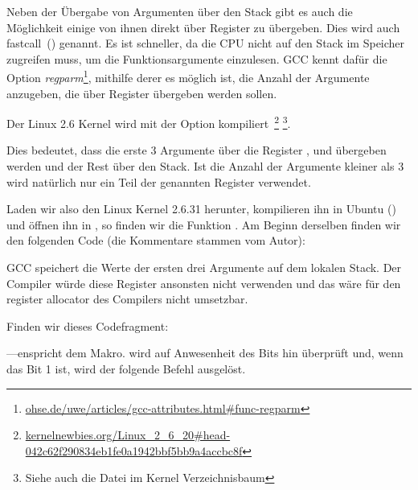 \newcommand{\URLREGPARM}{\href{http://go.yurichev.com/17040}{ohse.de/uwe/articles/gcc-attributes.html\#func-regparm}}

\label{regparm}
Neben der Übergabe von Argumenten über den Stack gibt es auch die Möglichkeit
einige von ihnen direkt über Register zu übergeben. Dies wird auch
fastcall~() genannt. 
Es ist schneller, da die CPU nicht auf den Stack im Speicher zugreifen muss, um
die Funktionsargumente einzulesen.
GCC kennt dafür die Option \emph{regparm}\footnote{\URLREGPARM}, mithilfe derer es
möglich ist, die Anzahl der Argumente anzugeben, die über Register übergeben
werden sollen.

\newcommand{\URLKERNELNEWB}{\href{http://go.yurichev.com/17066}{kernelnewbies.org/Linux\_2\_6\_20\#head-042c62f290834eb1fe0a1942bbf5bb9a4accbc8f}}
\newcommand{\CALLINGHFILE}{arch/x86/include/asm/calling.h}

Der Linux 2.6 Kernel wird mit der Option 
kompiliert~\footnote{\URLKERNELNEWB} \footnote{Siehe auch die \TT{\CALLINGHFILE}
Datei im Kernel Verzeichnisbaum}.

Dies bedeutet, dass die erste 3 Argumente über die Register \EAX, \EDX und \ECX
übergeben werden und der Rest über den Stack. Ist die Anzahl der Argumente
kleiner als 3 wird natürlich nur ein Teil der genannten Register verwendet.

Laden wir also den Linux Kernel 2.6.31 herunter, kompilieren ihn in Ubuntu
() und öffnen ihn in \IDA, so finden wir die Funktion
. Am Beginn derselben finden wir den folgenden Code (die
Kommentare stammen vom Autor):


GCC speichert die Werte der ersten drei Argumente auf dem lokalen Stack.
Der Compiler würde diese Register ansonsten nicht verwenden und das wäre für den
\gls{register allocator} des Compilers nicht umsetzbar.

Finden wir dieses Codefragment:



---enspricht dem  Makro.
 wird auf Anwesenheit des  Bits hin überprüft und, wenn
das Bit 1 ist, wird der folgende \JNZ Befehl ausgelöst.
